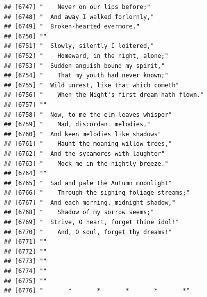\documentclass{article}\usepackage[]{graphicx}\usepackage[]{color}
\makeatletter
\newenvironment{kframe}{%
 \def\at@end@of@kframe{}%
 \ifinner\ifhmode%
  \def\at@end@of@kframe{\end{minipage}}%
  \begin{minipage}{\columnwidth}%
 \fi\fi%
 \def\FrameCommand##1{\hskip\@totalleftmargin \hskip-\fboxsep
 \colorbox{shadecolor}{##1}\hskip-\fboxsep
     \hskip-\linewidth \hskip-\@totalleftmargin \hskip\columnwidth}%
 \MakeFramed {\advance\hsize-\width
   \@totalleftmargin\z@ \linewidth\hsize
   \@setminipage}}%
 {\par\unskip\endMakeFramed%
 \at@end@of@kframe}
\newenvironment{knitrout}{}{} %
\makeatother
\begin{document}
\begin{knitrout}
\begin{kframe}
\begin{verbatim}
## [6747] "    Never on our lips before;"                                               
## [6748] "  And away I walked forlornly,"                                              
## [6749] "  Broken-hearted evermore."                                                  
## [6750] ""                                                                            
## [6751] "  Slowly, silently I loitered,"                                              
## [6752] "    Homeward, in the night, alone;"                                          
## [6753] "  Sudden anguish bound my spirit,"                                           
## [6754] "    That my youth had never known;"                                          
## [6755] "  Wild unrest, like that which cometh"                                       
## [6756] "    When the Night's first dream hath flown."                                
## [6757] ""                                                                            
## [6758] "  Now, to me the elm-leaves whisper"                                         
## [6759] "    Mad, discordant melodies,"                                               
## [6760] "  And keen melodies like shadows"                                            
## [6761] "    Haunt the moaning willow trees,"                                         
## [6762] "  And the sycamores with laughter"                                           
## [6763] "    Mock me in the nightly breeze."                                          
## [6764] ""                                                                            
## [6765] "  Sad and pale the Autumn moonlight"                                         
## [6766] "    Through the sighing foliage streams;"                                    
## [6767] "  And each morning, midnight shadow,"                                        
## [6768] "    Shadow of my sorrow seems;"                                              
## [6769] "  Strive, O heart, forget thine idol!"                                       
## [6770] "    And, O soul, forget thy dreams!"                                         
## [6771] ""                                                                            
## [6772] ""                                                                            
## [6773] ""                                                                            
## [6774] ""                                                                            
## [6775] ""                                                                            
## [6776] "       *       *       *       *       *"                                    

\end{verbatim}
\end{kframe}
\end{knitrout}
\end{document}

